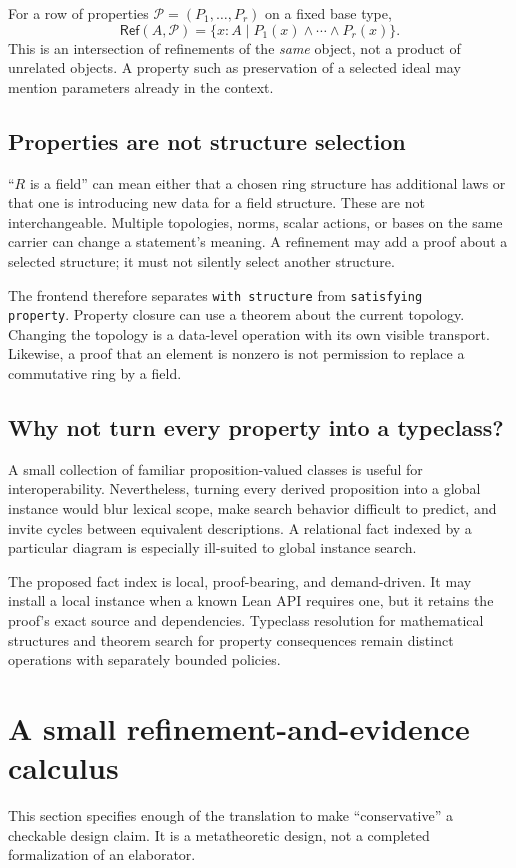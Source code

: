 \documentclass[11pt,a4paper]{article}
\newcommand{\code}[1]{\nolinkurl{#1}}
\newcommand{\Rfn}{\mathsf{Ref}}
\theoremstyle{plain}
\theoremstyle{definition}
\theoremstyle{remark}
\begin{document}
For a row of properties $\mathcal P=(P_1,\ldots,P_r)$ on a fixed base type,
\[
 \Rfn(A,\mathcal P)=\{x:A\mid P_1(x)\land\cdots\land P_r(x)\}.
\]
This is an intersection of refinements of the \emph{same} object, not a product
of unrelated objects. A property such as preservation of a selected ideal
may mention parameters already in the context.

\subsection{Properties are not structure selection}
``$R$ is a field'' can mean either that a chosen ring structure has additional
laws or that one is introducing new data for a field structure. These are not
interchangeable. Multiple topologies, norms, scalar actions, or bases on the
same carrier can change a statement's meaning. A refinement may add a proof
about a selected structure; it must not silently select another structure.

The frontend therefore separates \code{with structure} from \code{satisfying
property}. Property closure can use a theorem about the current topology.
Changing the topology is a data-level operation with its own visible transport.
Likewise, a proof that an element is nonzero is not permission to replace a
commutative ring by a field.

\subsection{Why not turn every property into a typeclass?}
A small collection of familiar proposition-valued classes is useful for
interoperability. Nevertheless, turning every derived proposition into a global
instance would blur lexical scope, make search behavior difficult to predict,
and invite cycles between equivalent descriptions. A relational fact indexed
by a particular diagram is especially ill-suited to global instance search.

The proposed fact index is local, proof-bearing, and demand-driven. It may
install a local instance when a known Lean API requires one, but it retains the
proof's exact source and dependencies. Typeclass resolution for mathematical
structures and theorem search for property consequences remain distinct
operations with separately bounded policies.

\section{A small refinement-and-evidence calculus}
\label{sec:calculus}
This section specifies enough of the translation to make ``conservative'' a
checkable design claim. It is a metatheoretic design, not a completed
formalization of an elaborator.
\end{document}
